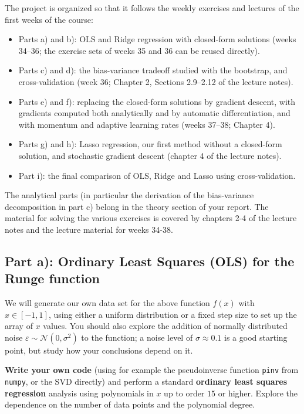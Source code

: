 \documentclass[11pt,a4paper]{article}
\begin{document}
The project is organized so that it follows the weekly exercises and lectures
of the first weeks of the course:
\begin{itemize}[nosep]
  \item Parts a) and b): OLS and Ridge regression with closed-form solutions
        (weeks 34--36; the exercise sets of weeks 35 and 36 can be reused
        directly). 
  \item Parts c) and d): the bias-variance tradeoff studied with the
        bootstrap, and cross-validation (week 36; Chapter 2, Sections
        2.9--2.12 of the lecture notes).
  \item Parts e) and f): replacing the closed-form solutions by gradient
        descent, with gradients computed both analytically and by automatic
        differentiation, and with momentum and adaptive learning rates
        (weeks 37--38; Chapter 4).
  \item Parts g) and h): Lasso regression, our first method without a
        closed-form solution, and stochastic gradient descent (chapter 4 of the lecture notes).
  \item Part i): the final comparison of OLS, Ridge and Lasso using
        cross-validation.
\end{itemize}
The analytical parts (in particular the derivation of the bias-variance
decomposition in part c) belong in the theory section of your report.
The material for solving the various exercises is covered by chapters 2-4 of the lecture notes and the lecture material for weeks 34-38.

\subsection*{Part a): Ordinary Least Squares (OLS) for the Runge function}

We will generate our own data set for the above function
$f(x)$ with $x\in[-1,1]$, using either a uniform distribution or a fixed step
size to set up the array of $x$ values.  You should also explore the addition
of normally distributed noise $\varepsilon\sim\mathcal{N}(0,\sigma^2)$ to the
function; a noise level of $\sigma\approx0.1$ is a good starting point, but
study how your conclusions depend on it.

\textbf{Write your own code} (using for example the pseudoinverse function
\texttt{pinv} from \texttt{numpy}, or the SVD directly) and perform a standard
\textbf{ordinary least squares regression} analysis using polynomials in $x$
up to order $15$ or higher.  Explore the dependence on the number of data
points and the polynomial degree.
\end{document}
